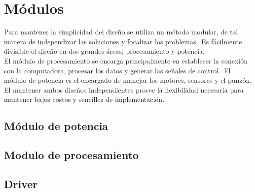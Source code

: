 \chapter{M\'odulos}

Para mantener la simplicidad del dise\~no se utiliza un m\'etodo modular, de
tal
manera de independizar las soluciones y focalizar los problemas.\
Es f\'acilmente divisible el dise\~no en dos grandes \'areas; procesamiento y
potencia.\\

El m\'odulo de procesamiento se encarga principalmente en establecer la
conexi\'on con la computadora, procesar los datos y generar las se\~nales de
control.\
El m\'odulo de potencia es el encargado de manejar los motores, sensores y el
punz\'on.\\

El mantener ambos dise\~nos independientes provee la flexibilidad necesaria
para mantener bajos costos y sencillez de implementaci\'on.


\section{M\'odulo de potencia}\label{cap:motors_section}


\section{Modulo de procesamiento}


\section{Driver}

